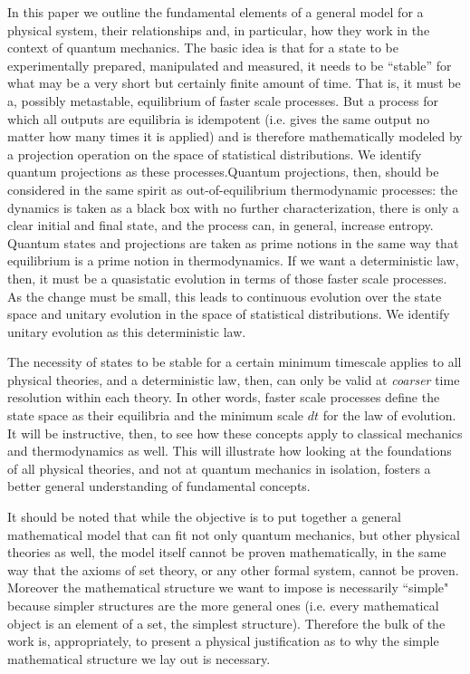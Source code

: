 \documentclass[11pt]{article}
\begin{document}
In this paper we outline the fundamental elements of a general model for a physical system, their relationships and, in particular, how they work in the context of quantum mechanics. The basic idea is that for a state to be experimentally prepared, manipulated and measured, it needs to be ``stable'' for what may be a very short but certainly finite amount of time. That is, it must be a, possibly metastable, equilibrium of faster scale processes. But a process for which all outputs are equilibria is idempotent (i.e. gives the same output no matter how many times it is applied) and is therefore mathematically modeled by a projection operation on the space of statistical distributions. We identify quantum projections as these processes.Quantum projections, then, should be considered in the same spirit as out-of-equilibrium thermodynamic processes: the dynamics is taken as a black box with no further characterization, there is only a clear initial and final state, and the process can, in general, increase entropy. Quantum states and projections are taken as prime notions in the same way that equilibrium is a prime notion in thermodynamics. If we want a deterministic law, then, it must be a quasistatic evolution in terms of those faster scale processes. As the change must be small, this leads to continuous evolution over the state space and unitary evolution in the space of statistical distributions. We identify unitary evolution as this deterministic law.

The necessity of states to be stable for a certain minimum timescale applies to all physical theories, and a deterministic law, then, can only be valid at \emph{coarser} time resolution within each theory. In other words, faster scale processes define the state space as their equilibria and the minimum scale $dt$ for the law of evolution. It will be instructive, then, to see how these concepts apply to classical mechanics and thermodynamics as well. This will illustrate how looking at the foundations of all physical theories, and not at quantum mechanics in isolation, fosters a better general understanding of fundamental concepts.

It should be noted that while the objective is to put together a general mathematical model that can fit not only quantum mechanics, but other physical theories as well, the model itself cannot be proven mathematically, in the same way that the axioms of set theory, or any other formal system, cannot be proven. Moreover the mathematical structure we want to impose is necessarily ``simple" because simpler structures are the more general ones (i.e. every mathematical object is an element of a set, the simplest structure). Therefore the bulk of the work is, appropriately, to present a physical justification as to why the simple mathematical structure we lay out is necessary.
\end{document}
